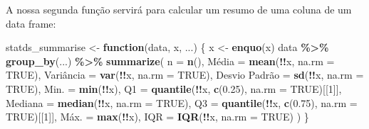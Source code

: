 \documentclass[
]{latex/krantz}
\newenvironment{Shaded}{\begin{snugshade}}{\end{snugshade}}
\newcommand{\AttributeTok}[1]{\textcolor[rgb]{0.13,0.29,0.53}{#1}}
\newcommand{\ConstantTok}[1]{\textcolor[rgb]{0.56,0.35,0.01}{#1}}
\newcommand{\ControlFlowTok}[1]{\textcolor[rgb]{0.13,0.29,0.53}{\textbf{#1}}}
\newcommand{\DecValTok}[1]{\textcolor[rgb]{0.00,0.00,0.81}{#1}}
\newcommand{\FloatTok}[1]{\textcolor[rgb]{0.00,0.00,0.81}{#1}}
\newcommand{\FunctionTok}[1]{\textcolor[rgb]{0.13,0.29,0.53}{\textbf{#1}}}
\newcommand{\NormalTok}[1]{#1}
\newcommand{\OtherTok}[1]{\textcolor[rgb]{0.56,0.35,0.01}{#1}}
\newcommand{\SpecialCharTok}[1]{\textcolor[rgb]{0.81,0.36,0.00}{\textbf{#1}}}
\newcommand{\StringTok}[1]{\textcolor[rgb]{0.31,0.60,0.02}{#1}}
\theoremstyle{definition}
\theoremstyle{definition}
\theoremstyle{definition}
\theoremstyle{definition}
\theoremstyle{remark}
\begin{document}
A nossa segunda função servirá para calcular um resumo de uma coluna de um data frame:

\begin{Shaded}
\begin{Highlighting}[]
\NormalTok{statds\_summarise }\OtherTok{\textless{}{-}} \ControlFlowTok{function}\NormalTok{(data, x, ...) \{}
\NormalTok{  x }\OtherTok{\textless{}{-}} \FunctionTok{enquo}\NormalTok{(x)}
\NormalTok{  data }\SpecialCharTok{\%\textgreater{}\%} 
    \FunctionTok{group\_by}\NormalTok{(...) }\SpecialCharTok{\%\textgreater{}\%}
    \FunctionTok{summarize}\NormalTok{(}
        \StringTok{\textasciigrave{}}\AttributeTok{n}\StringTok{\textasciigrave{}} \OtherTok{=} \FunctionTok{n}\NormalTok{(),}
        \StringTok{\textasciigrave{}}\AttributeTok{Média}\StringTok{\textasciigrave{}} \OtherTok{=} \FunctionTok{mean}\NormalTok{(}\SpecialCharTok{!!}\NormalTok{x, }\AttributeTok{na.rm =} \ConstantTok{TRUE}\NormalTok{), }
        \StringTok{\textasciigrave{}}\AttributeTok{Variância}\StringTok{\textasciigrave{}} \OtherTok{=} \FunctionTok{var}\NormalTok{(}\SpecialCharTok{!!}\NormalTok{x, }\AttributeTok{na.rm =} \ConstantTok{TRUE}\NormalTok{),}
        \StringTok{\textasciigrave{}}\AttributeTok{Desvio Padrão}\StringTok{\textasciigrave{}} \OtherTok{=} \FunctionTok{sd}\NormalTok{(}\SpecialCharTok{!!}\NormalTok{x, }\AttributeTok{na.rm =} \ConstantTok{TRUE}\NormalTok{),}
        \StringTok{\textasciigrave{}}\AttributeTok{Min.}\StringTok{\textasciigrave{}} \OtherTok{=} \FunctionTok{min}\NormalTok{(}\SpecialCharTok{!!}\NormalTok{x),}
        \StringTok{\textasciigrave{}}\AttributeTok{Q1}\StringTok{\textasciigrave{}} \OtherTok{=} \FunctionTok{quantile}\NormalTok{(}\SpecialCharTok{!!}\NormalTok{x, }\FunctionTok{c}\NormalTok{(}\FloatTok{0.25}\NormalTok{), }\AttributeTok{na.rm =} \ConstantTok{TRUE}\NormalTok{)[[}\DecValTok{1}\NormalTok{]],}
        \StringTok{\textasciigrave{}}\AttributeTok{Mediana}\StringTok{\textasciigrave{}} \OtherTok{=} \FunctionTok{median}\NormalTok{(}\SpecialCharTok{!!}\NormalTok{x, }\AttributeTok{na.rm =} \ConstantTok{TRUE}\NormalTok{),}
        \StringTok{\textasciigrave{}}\AttributeTok{Q3}\StringTok{\textasciigrave{}} \OtherTok{=} \FunctionTok{quantile}\NormalTok{(}\SpecialCharTok{!!}\NormalTok{x, }\FunctionTok{c}\NormalTok{(}\FloatTok{0.75}\NormalTok{), }\AttributeTok{na.rm =} \ConstantTok{TRUE}\NormalTok{)[[}\DecValTok{1}\NormalTok{]],}
        \StringTok{\textasciigrave{}}\AttributeTok{Máx.}\StringTok{\textasciigrave{}} \OtherTok{=} \FunctionTok{max}\NormalTok{(}\SpecialCharTok{!!}\NormalTok{x),}
        \StringTok{\textasciigrave{}}\AttributeTok{IQR}\StringTok{\textasciigrave{}} \OtherTok{=} \FunctionTok{IQR}\NormalTok{(}\SpecialCharTok{!!}\NormalTok{x, }\AttributeTok{na.rm =} \ConstantTok{TRUE}\NormalTok{)}
\NormalTok{    )}
\NormalTok{\}}
\end{Highlighting}
\end{Shaded}
\end{document}
